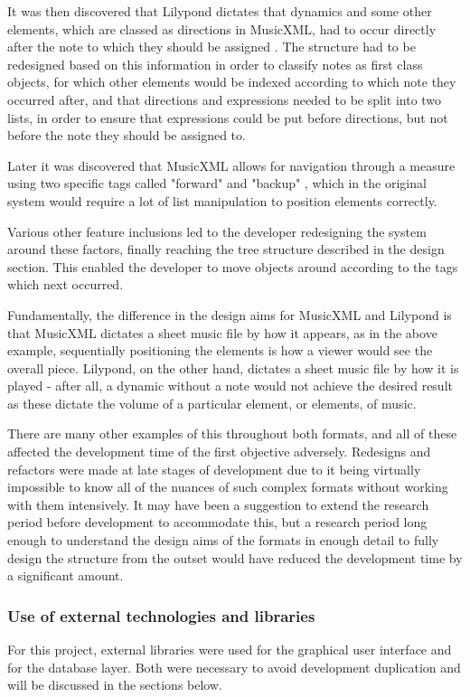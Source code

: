 It was then discovered that Lilypond dictates that dynamics and some other elements, which are classed as directions in MusicXML, had to occur directly after the note to which they should be assigned \parencite{ExpressionLilypond}.
 The structure had to be redesigned based on this information in order to classify notes as first class objects, for which other elements would be indexed according to which note they occurred after, and that directions and expressions needed to be split into two lists, in order to ensure that expressions could be put before directions, but not before the note they should be assigned to.

Later it was discovered that MusicXML allows for navigation through a measure using two specific tags called "forward" and "backup" \parencite{forward}, which in the original system would require a lot of list manipulation to position elements correctly. 

Various other feature inclusions led to the developer redesigning the system around these factors, finally reaching the tree structure described in the design section. This enabled the developer to move objects around according to the tags which next occurred.

Fundamentally, the difference in the design aims for MusicXML and Lilypond is that MusicXML dictates a sheet music file by how it appears, as in the above example, sequentially positioning the elements is how a viewer would see the overall piece. Lilypond, on the other hand, dictates a sheet music file by how it is played - after all, a dynamic without a note would not achieve the desired result as these dictate the volume of a particular element, or elements, of music. 

There are many other examples of this throughout both formats, and all of these affected the development time of the first objective adversely. Redesigns and refactors were made at late stages of development due to it being virtually impossible to know all of the nuances of such complex formats without working with them intensively. It may have been a suggestion to extend the research period before development to accommodate this, but a research period long enough to understand the design aims of the formats in enough detail to fully design the structure from the outset would have reduced the development time by a significant amount.

\subsubsection{Use of external technologies and libraries}
For this project, external libraries were used for the graphical user interface and for the database layer. Both were necessary to avoid development duplication and will be discussed in the sections below.

